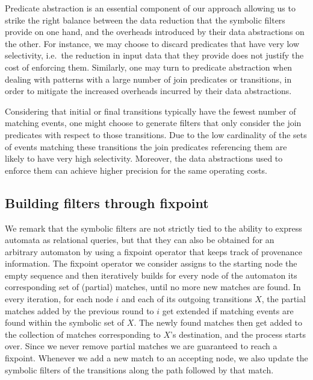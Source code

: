 Predicate abstraction is an essential component of our approach
allowing us to strike the right balance between the data reduction that the
symbolic filters provide on one hand, and the overheads introduced by their
data abstractions on the other.
For instance, we may choose to discard
predicates that have very low selectivity, i.e.\ the reduction in input 
data
that they provide does not justify the cost of enforcing them.
Similarly, one may turn to predicate abstraction when dealing with patterns
 with
a large number of join predicates or transitions, in order to mitigate the
increased overheads incurred by their data abstractions.

Considering that initial or final transitions typically have the fewest
number of matching events, one might choose to generate filters that only
consider the join predicates with respect to those transitions.
Due to the low cardinality of the sets of events matching these transitions 
the join predicates referencing them are likely to have very high 
selectivity.
Moreover, the data abstractions used to enforce them can achieve higher
precision for the same operating costs.




\subsection{Building filters through fixpoint}


We remark that the symbolic filters are not strictly tied to the ability to 
express automata as relational queries, but that they can also be obtained for 
an arbitrary automaton by using a fixpoint operator that keeps track of 
provenance information.
The fixpoint operator we consider assigns to the starting node the empty 
sequence and then iteratively builds for every node of the automaton its 
corresponding set of (partial) matches, until no more new matches are found. 
In every iteration, for each node $i$ and each of its outgoing transitions $X$, 
the partial matches added by the previous round to $i$ get extended if matching 
events are found within the symbolic set of $X$. 
The newly found matches then get added to the collection of matches 
corresponding to $X$'s destination, and the process starts over.  
Since we never remove partial matches we are guaranteed to reach a fixpoint.
Whenever we add a new match to an accepting node, we also update the symbolic 
filters of the transitions along the path followed by that match.

